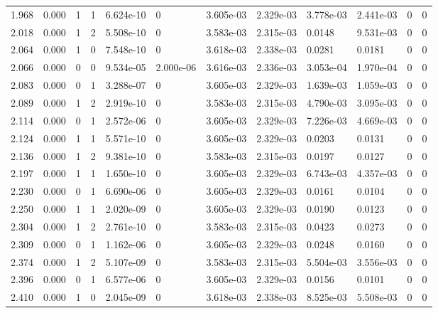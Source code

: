 \documentclass[preview]{standalone}
\begin{document}
{{{\begin{tabular}{L{1.2cm}C{1.2cm} C{0.3cm}C{0.5cm} C{1.4cm}C{1.4cm} C{1.4cm}C{1.4cm} C{1.6cm}C{1.6cm} C{1.6cm}C{1.6cm}}
  1.968  &  0.000  & 1     &  1 &  6.624e-10  & 0  &  3.605e-03&   2.329e-03& 3.778e-03 & 2.441e-03   &  0 & 0  \\ 
  2.018  &  0.000  & 1     &  2 &  5.508e-10  & 0  &  3.583e-03&   2.315e-03& 0.0148 & 9.531e-03   &  0 & 0  \\ 
  2.064  &  0.000  & 1     &  0 &  7.548e-10  & 0  &  3.618e-03&   2.338e-03& 0.0281 & 0.0181   &  0 & 0  \\ 
  2.066  &  0.000  & 0     &  0 &  9.534e-05  & 2.000e-06  &  3.616e-03&   2.336e-03& 3.053e-04 & 1.970e-04   &  0 & 0  \\ 
  2.083  &  0.000  & 0     &  1 &  3.288e-07  & 0  &  3.605e-03&   2.329e-03& 1.639e-03 & 1.059e-03   &  0 & 0  \\ 
  2.089  &  0.000  & 1     &  2 &  2.919e-10  & 0  &  3.583e-03&   2.315e-03& 4.790e-03 & 3.095e-03   &  0 & 0  \\ 
  2.114  &  0.000  & 0     &  1 &  2.572e-06  & 0  &  3.605e-03&   2.329e-03& 7.226e-03 & 4.669e-03   &  0 & 0  \\ 
  2.124  &  0.000  & 1     &  1 &  5.571e-10  & 0  &  3.605e-03&   2.329e-03& 0.0203 & 0.0131   &  0 & 0  \\ 
  2.136  &  0.000  & 1     &  2 &  9.381e-10  & 0  &  3.583e-03&   2.315e-03& 0.0197 & 0.0127   &  0 & 0  \\ 
  2.197  &  0.000  & 1     &  1 &  1.650e-10  & 0  &  3.605e-03&   2.329e-03& 6.743e-03 & 4.357e-03   &  0 & 0  \\ 
  2.230  &  0.000  & 0     &  1 &  6.690e-06  & 0  &  3.605e-03&   2.329e-03& 0.0161 & 0.0104   &  0 & 0  \\ 
  2.250  &  0.000  & 1     &  1 &  2.020e-09  & 0  &  3.605e-03&   2.329e-03& 0.0190 & 0.0123   &  0 & 0  \\ 
  2.304  &  0.000  & 1     &  2 &  2.761e-10  & 0  &  3.583e-03&   2.315e-03& 0.0423 & 0.0273   &  0 & 0  \\ 
  2.309  &  0.000  & 0     &  1 &  1.162e-06  & 0  &  3.605e-03&   2.329e-03& 0.0248 & 0.0160   &  0 & 0  \\ 
  2.374  &  0.000  & 1     &  2 &  5.107e-09  & 0  &  3.583e-03&   2.315e-03& 5.504e-03 & 3.556e-03   &  0 & 0  \\ 
  2.396  &  0.000  & 0     &  1 &  6.577e-06  & 0  &  3.605e-03&   2.329e-03& 0.0156 & 0.0101   &  0 & 0  \\ 
  2.410  &  0.000  & 1     &  0 &  2.045e-09  & 0  &  3.618e-03&   2.338e-03& 8.525e-03 & 5.508e-03   &  0 & 0  \\ 

\end{tabular}}}}
\end{document}
